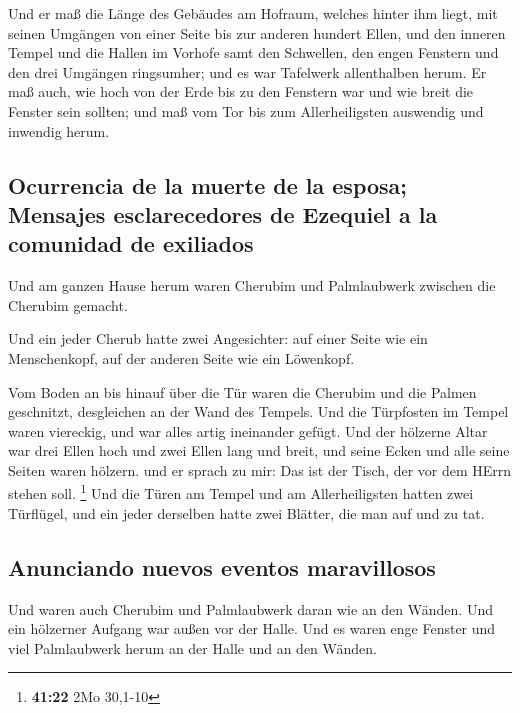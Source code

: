  Und er maß die Länge des Gebäudes am Hofraum, welches
hinter ihm liegt, mit seinen Umgängen von einer Seite bis zur anderen
hundert Ellen, und den inneren Tempel und die Hallen im Vorhofe
 samt den Schwellen, den engen Fenstern und den drei
Umgängen ringsumher; und es war Tafelwerk allenthalben herum.
 Er maß auch, wie hoch von der Erde bis zu den Fenstern
war und wie breit die Fenster sein sollten; und maß vom Tor bis zum
Allerheiligsten auswendig und inwendig herum.

\hypertarget{ocurrencia-de-la-muerte-de-la-esposa-mensajes-esclarecedores-de-ezequiel-a-la-comunidad-de-exiliados}{%
\subsection{Ocurrencia de la muerte de la esposa; Mensajes
esclarecedores de Ezequiel a la comunidad de
exiliados}\label{ocurrencia-de-la-muerte-de-la-esposa-mensajes-esclarecedores-de-ezequiel-a-la-comunidad-de-exiliados}}

 Und am ganzen Hause herum waren Cherubim und
Palmlaubwerk zwischen die Cherubim gemacht.

 Und ein jeder Cherub hatte zwei Angesichter: auf einer
Seite wie ein Menschenkopf, auf der anderen Seite wie ein Löwenkopf.

 Vom Boden an bis hinauf über die Tür waren die Cherubim
und die Palmen geschnitzt, desgleichen an der Wand des Tempels.
 Und die Türpfosten im Tempel waren viereckig, und war
alles artig ineinander gefügt.  Und der hölzerne Altar
war drei Ellen hoch und zwei Ellen lang und breit, und seine Ecken und
alle seine Seiten waren hölzern. und er sprach zu mir: Das ist der
Tisch, der vor dem HErrn stehen soll. \footnote{\textbf{41:22} 2Mo
  30,1-10}  Und die Türen am Tempel und am
Allerheiligsten  hatten zwei Türflügel, und ein jeder
derselben hatte zwei Blätter, die man auf und zu tat.

\hypertarget{anunciando-nuevos-eventos-maravillosos}{%
\subsection{Anunciando nuevos eventos
maravillosos}\label{anunciando-nuevos-eventos-maravillosos}}

 Und waren auch Cherubim und Palmlaubwerk daran wie an
den Wänden. Und ein hölzerner Aufgang war außen vor der Halle.
 Und es waren enge Fenster und viel Palmlaubwerk herum an
der Halle und an den Wänden.

